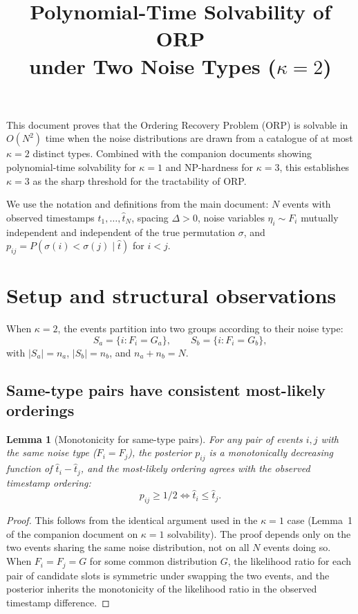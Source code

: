 \documentclass[11pt]{article}
\title{Polynomial-Time Solvability of ORP\\under Two Noise Types ($\kappa = 2$)}
\date{}
\newtheorem{lemma}[theorem]{Lemma}
\begin{document}
\maketitle

\noindent This document proves that the Ordering Recovery Problem (ORP) is solvable in $O(N^2)$ time when the noise distributions are drawn from a catalogue of at most $\kappa = 2$ distinct types. Combined with the companion documents showing polynomial-time solvability for $\kappa = 1$ and NP-hardness for $\kappa = 3$, this establishes $\kappa = 3$ as the sharp threshold for the tractability of ORP.

We use the notation and definitions from the main document: $N$ events with observed timestamps $\hat{t}_1, \ldots, \hat{t}_N$, spacing $\Delta > 0$, noise variables $\eta_i \sim F_i$ mutually independent and independent of the true permutation $\sigma$, and $p_{ij} = P(\sigma(i) < \sigma(j) \mid \hat{t})$ for $i < j$.

\section{Setup and structural observations}

When $\kappa = 2$, the events partition into two groups according to their noise type:
\begin{equation}
S_a = \{i : F_i = G_a\}, \qquad S_b = \{i : F_i = G_b\},
\end{equation}
with $|S_a| = n_a$, $|S_b| = n_b$, and $n_a + n_b = N$.

\subsection{Same-type pairs have consistent most-likely orderings}

\begin{lemma}[Monotonicity for same-type pairs]\label{lem:same-type}
For any pair of events $i, j$ with the same noise type ($F_i = F_j$), the posterior $p_{ij}$ is a monotonically decreasing function of $\hat{t}_i - \hat{t}_j$, and the most-likely ordering agrees with the observed timestamp ordering:
\begin{equation}
p_{ij} \ge 1/2 \iff \hat{t}_i \le \hat{t}_j.
\end{equation}
\end{lemma}

\begin{proof}
This follows from the identical argument used in the $\kappa = 1$ case (Lemma~1 of the companion document on $\kappa = 1$ solvability). The proof depends only on the two events sharing the same noise distribution, not on all $N$ events doing so. When $F_i = F_j = G$ for some common distribution $G$, the likelihood ratio for each pair of candidate slots is symmetric under swapping the two events, and the posterior inherits the monotonicity of the likelihood ratio in the observed timestamp difference.
\end{proof}
\end{document}
